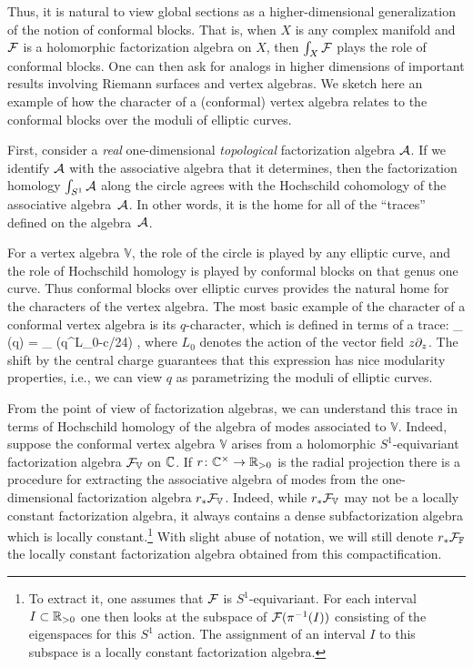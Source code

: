 \documentclass[11pt]{amsart}
\renewcommand{\op}{\operatorname}
\begin{document}
Thus, it is natural to view global sections as a higher-dimensional generalization of the notion of conformal blocks.
That is, when $X$ is any complex manifold and $\mathcal F$ is a holomorphic factorization algebra on $X$, 
then $\int_X \mathcal F$ plays the role of conformal blocks.
One can then ask for analogs in higher dimensions of important results involving Riemann surfaces and vertex algebras.
We sketch here an example of how the character of a (conformal) vertex algebra relates to the conformal blocks over the moduli of elliptic curves.

First, consider a \textit{real} one-dimensional \textit{topological} factorization algebra $\mathcal A$.
If we identify $\mathcal A$ with the associative algebra that it determines, 
then the factorization homology $\int_{S^1} \mathcal A$ along the circle agrees with the Hochschild cohomology of the associative algebra~$\mathcal A$.
In other words, it is the home for all of the ``traces'' defined on the algebra~$\mathcal A$.

For a vertex algebra $\mathbb{V}$, the role of the circle is played by any elliptic curve,
and the role of Hochschild homology is played by conformal blocks on that genus one curve. 
Thus conformal blocks over elliptic curves provides the natural home for the characters of the vertex algebra.
The most basic example of the character of a conformal vertex algebra is its $q$-character,
which is defined in terms of a trace:
\beqn
\op{char}_{} (q) = \op{Tr}_{} (q^{L_0-c/24}) ,
\eeqn
where $L_0$ denotes the action of the vector field $z \partial_z$.
The shift by the central charge guarantees that this expression has nice modularity properties, i.e., we can view $q$ as parametrizing the moduli of elliptic curves.

From the point of view of factorization algebras, we can understand this trace in terms of Hochschild homology of the algebra of modes associated to $\mathbb{V}$.
Indeed, suppose the conformal vertex algebra $\mathbb{V}$ arises from a holomorphic $S^1$-equivariant factorization algebra $\mathcal F_{\mathbb{V}}$ on ${\mathbb{C}}$.
If $r \colon {\mathbb{C}}^\times \to \mathbb R_{>0}$ is the radial projection there is a procedure for extracting the associative algebra of modes from the one-dimensional factorization algebra $r_* \mathcal F_{\mathbb{V}}$.
Indeed, while $r_* \mathcal F_{\mathbb{V}}$ may not be a locally constant factorization algebra, it always contains a dense subfactorization algebra which is locally constant.\footnote{To extract it, one assumes that $\mathcal F$ is $S^1$-equivariant.
For each interval $I \subset \mathbb R_{>0}$ one then looks at the subspace of $\mathcal F(\pi^{-1}(I))$ consisting of the eigenspaces for this $S^1$ action.
The assignment of an interval $I$ to this subspace is a locally constant factorization algebra.}
With slight abuse of notation, we will still denote $r_* \mathcal F_{\mathbb{F}}$ the locally constant factorization algebra obtained from this compactification.
\end{document}
